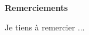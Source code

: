\textbf{Remerciements}
\begin{flushleft}
    Je tiens à remercier {\prenomSuperviseur} {\nomSuperviseur}...
\end{flushleft}
\vspace*{\fill}